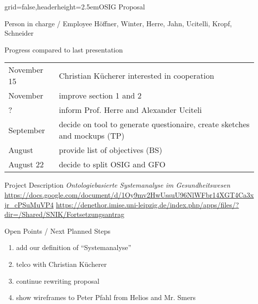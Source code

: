 \documentclass[]{kiesgrube}
\begin{document}
\begin{poster}%
{grid=false,headerheight=2.5em}{}{OSIG Proposal}{}

\begin{posterbox}[name=person,column=0,row=0]{Person in charge / Employee}
Höffner, Winter, Herre, Jahn, Ucitelli, Kropf, Schneider
\end{posterbox}
\begin{posterbox}[name=progress,below=person]{Progress compared to last presentation}
\begin{tabulary}{\textwidth}{lL}
November 15	&Christian Kücherer interested in cooperation\\
November 	&improve section 1 and 2\\
?		&inform Prof. Herre and Alexander Uciteli\\
September	&decide on tool to generate questionaire, create sketches and mockups (TP)\\
August		&provide list of objectives (BS)\\
August 22	&decide to split OSIG and GFO\\
\end{tabulary}
\end{posterbox}
\begin{posterbox}[name=description,column=1,row=0]{Project Description}
\emph{Ontologiebasierte Systemanalyse im Gesundheitswesen}\\
\url{https://docs.google.com/document/d/1Oy9mv2HwUssuU96NlWFbr14XGT4Ca3xjr\_cPSuMuVP4}
\url{https://denethor.imise.uni-leipzig.de/index.php/apps/files/?dir=/Shared/SNIK/Fortsetzungsantrag}
\end{posterbox}
\begin{posterbox}[name=open,column=1,below=description]{Open Points / Next Planned Steps}
\begin{enumerate}
\item add our definition of \enquote{Systemanalyse}
\item telco with Christian Kücherer
\item continue rewriting proposal
\item show wireframes to Peter Pfahl from Helios and Mr. Smers
\end{enumerate}

\end{posterbox}
\end{poster}
\end{document}
